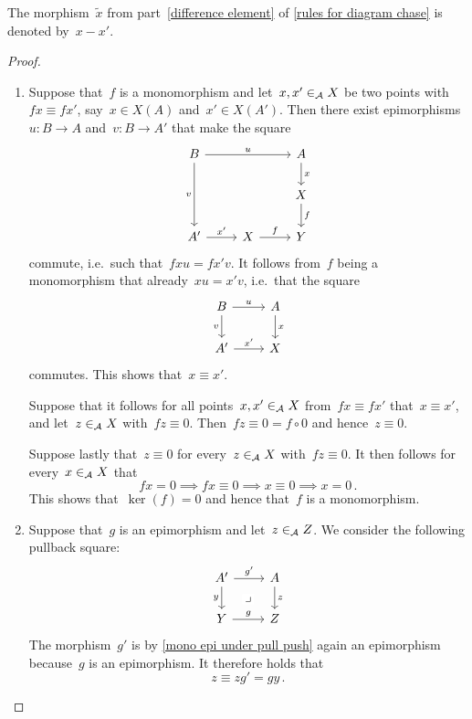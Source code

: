 \begin{notationnonum}
  The morphism~$\tilde{x}$ from part~\ref*{difference element} of \cref{rules for diagram chase} is denoted by~$x - x'$.
\end{notationnonum}


\begin{proof}
  \leavevmode
  \begin{enumerate}
    \item
      Suppose that~$f$ is a monomorphism and let~$x, x' \in_{\mathcal{A}} X$ be two points with~$fx \equiv fx'$, say~$x \in X(A)$ and~$x' \in X(A')$.
      Then there exist epimorphisms~$u \colon B \to A$ and~$v \colon B \to A'$ that make the square
      \[
        \begin{tikzcd}
            B
            \arrow{rr}[above]{u}
            \arrow{dd}[left]{v}
          & {}
          & A
            \arrow{d}[right]{x}
          \\
            {}
          & {}
          & X
            \arrow{d}[right]{f}
          \\
            A'
            \arrow{r}[above]{x'}
          & X
            \arrow{r}[above]{f}
          & Y
        \end{tikzcd}
      \]
      commute, i.e.\ such that~$f x u = f x' v$.
      It follows from~$f$ being a monomorphism that already~$x u = x' v$, i.e.\ that the square
      \[
        \begin{tikzcd}
            B
            \arrow{r}[above]{u}
            \arrow{d}[left]{v}
          & A
            \arrow{d}[right]{x}
          \\
            A'
            \arrow{r}[above]{x'}
          & X
        \end{tikzcd}
      \]
      commutes.
      This shows that~$x \equiv x'$.
      
      Suppose that it follows for all points~$x, x' \in_{\mathcal{A}} X$ from~$f x \equiv f x'$ that~$x \equiv x'$, and let~$z \in_{\mathcal{A}} X$ with~$f z \equiv 0$.
      Then~$fz \equiv 0 = f \circ 0$ and hence~$z \equiv 0$.
      
      Suppose lastly that~$z \equiv 0$ for every~$z \in_{\mathcal{A}} X$ with~$fz \equiv 0$.
      It then follows for every~$x \in_{\mathcal{A}} X$ that
      \[
                  fx = 0
        \implies  fx \equiv 0
        \implies  x \equiv 0
        \implies  x = 0 \,.
      \]
      This shows that~$\ker(f) = 0$ and hence that~$f$ is a monomorphism.
    \item
      Suppose that~$g$ is an epimorphism and let~$z \in_{\mathcal{A}} Z$.
      We consider the following pullback square:
      \[
        \begin{tikzcd}
            A'
            \arrow{r}[above]{g'}
            \arrow{d}[left]{y}
            \arrow[phantom]{dr}[description]{\pb}
          & A
            \arrow{d}[right]{z}
          \\
            Y
            \arrow{r}[above]{g}
          & Z
        \end{tikzcd}
      \]
      The morphism~$g'$ is by \cref{mono epi under pull push} again an epimorphism because~$g$ is an epimorphism.
      It therefore holds that
      \[
                z
        \equiv  z g'
        =       g y \,.
      \]
      

\end{enumerate}
\end{proof}
